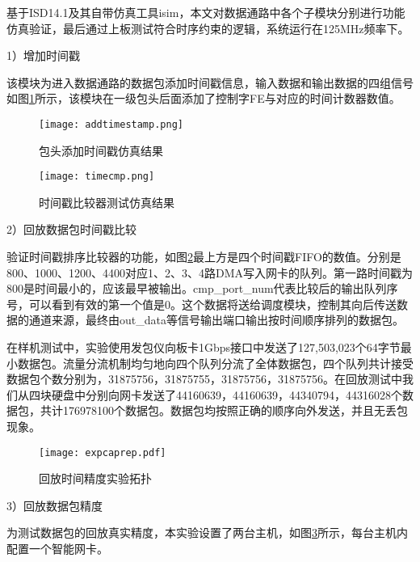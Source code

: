 \label{chap37}


基于ISD14.1及其自带仿真工具isim，本文对数据通路中各个子模块分别进行功能仿真验证，最后通过上板测试符合时序约束的逻辑，系统运行在125MHz频率下。

1）增加时间戳

该模块为进入数据通路的数据包添加时间戳信息，输入数据和输出数据的四组信号如图\ref{fig:addtimestamp}所示，该模块在一级包头后面添加了控制字FE与对应的时间计数器数值。

\begin{figure}[!ht]
	\centering 
	\vspace{-1.5mm} 
	\texttt{[image: addtimestamp.png]}
	\caption{包头添加时间戳仿真结果} \label{fig:addtimestamp}
\end{figure}

\begin{figure}[!ht]
	\centering 
	\vspace{-1.5mm} 
	\texttt{[image: timecmp.png]}
	\caption{时间戳比较器测试仿真结果} \label{fig:timecmp}
\end{figure}

2）回放数据包时间戳比较

验证时间戳排序比较器的功能，如图\ref{fig:timecmp}最上方是四个时间戳FIFO的数值。分别是800、1000、1200、4400对应1、2、3、4路DMA写入网卡的队列。第一路时间戳为800是时间最小的，应该最早被输出。cmp\_port\_num代表比较后的输出队列序号，可以看到有效的第一个值是0。这个数据将送给调度模块，控制其向后传送数据的通道来源，最终由out\_data等信号输出端口输出按时间顺序排列的数据包。

在样机测试中，实验使用发包仪向板卡1Gbps接口中发送了127,503,023个64字节最小数据包。流量分流机制均匀地向四个队列分流了全体数据包，四个队列共计接受数据包个数分别为，31875756，31875755，31875756，31875756。在回放测试中我们从四块硬盘中分别向网卡发送了44160639，44160639，44340794，44316028个数据包，共计176978100个数据包。数据包均按照正确的顺序向外发送，并且无丢包现象。

\begin{figure}[!ht]
	\centering 
	\vspace{-1.5mm} 
	\texttt{[image: expcaprep.pdf]}
	\caption{回放时间精度实验拓扑} \label{fig:expcaprep}
\end{figure}

3）回放数据包精度

为测试数据包的回放真实精度，本实验设置了两台主机，如图\ref{fig:expcaprep}所示，每台主机内配置一个智能网卡。


